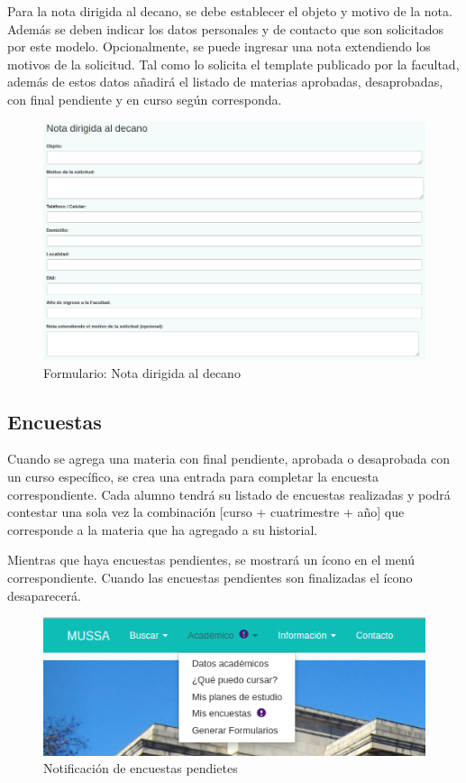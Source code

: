 \documentclass[a4paper]{article}
\begin{document}
Para la nota dirigida al decano, se debe establecer el objeto y motivo de la nota. Además se deben indicar los datos personales y de contacto que son solicitados por este modelo. Opcionalmente, se puede ingresar una nota extendiendo los motivos de la solicitud.
Tal como lo solicita el template publicado por la facultad, además de estos datos añadirá el listado de materias aprobadas, desaprobadas, con final pendiente y en curso según corresponda.

\begin{figure}[H]
\centering
\includegraphics[scale=0.4]{Imagenes/formulario_nota_al_decano.png}\par
\caption{Formulario: Nota dirigida al decano}
\end{figure}

\subsection{Encuestas}

Cuando se agrega una materia con final pendiente, aprobada o desaprobada con un curso específico, se crea una entrada para completar la encuesta correspondiente. Cada alumno tendrá su listado de encuestas realizadas y podrá contestar una sola vez la combinación [curso + cuatrimestre + año] que corresponde a la materia que ha agregado a su historial.

Mientras que haya encuestas pendientes, se mostrará un ícono en el menú correspondiente. Cuando las encuestas pendientes son finalizadas el ícono desaparecerá.

\begin{figure}[H]
\centering
\includegraphics[scale=0.4]{Imagenes/notificacion_encuestas.png}\par
\caption{Notificación de encuestas pendietes}
\end{figure}
\end{document}
